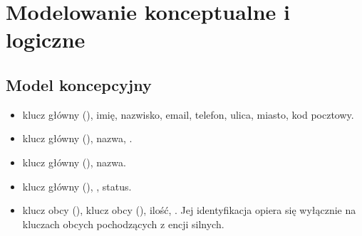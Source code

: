 \documentclass[letterpaper,10pt,polish]{sphinxmanual}
\begin{document}
\section{Modelowanie konceptualne i logiczne}
\label{\detokenize{rozdzial_3/index:modelowanie-konceptualne-i-logiczne}}

\subsection{Model koncepcyjny}
\label{\detokenize{rozdzial_3/index:model-koncepcyjny}}
\sphinxAtStartPar
{}
\begin{itemize}
\item {} 
\sphinxAtStartPar
{} klucz główny (), imię, nazwisko, e\sphinxhyphen{}mail, telefon, ulica, miasto, kod pocztowy.

\item {} 
\sphinxAtStartPar
{} klucz główny (), nazwa, .

\item {} 
\sphinxAtStartPar
{} klucz główny (), nazwa.

\item {} 
\sphinxAtStartPar
{} klucz główny (), , status.

\end{itemize}

\sphinxAtStartPar
{}
\begin{itemize}
\item {} 
\sphinxAtStartPar
{} klucz obcy (), klucz obcy (), ilość, . Jej identyfikacja opiera się wyłącznie na kluczach obcych pochodzących z encji silnych.

\end{itemize}

\sphinxAtStartPar
{}
\end{document}
